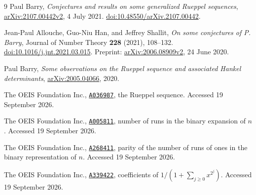 \documentclass[11pt,a4paper]{article}
\numberwithin{equation}{section}
\theoremstyle{definition}
\theoremstyle{remark}
\newcommand{\oeis}[1]{\href{https://oeis.org/#1}{\texttt{#1}}}
\newcommand{\arxiv}[1]{\href{https://arxiv.org/abs/#1}{arXiv:#1}}
\begin{document}
\begin{thebibliography}{9}
Paul Barry,
\emph{Conjectures and results on some generalized Rueppel sequences},
\arxiv{2107.00442v2}, 4 July 2021.
\href{https://doi.org/10.48550/arXiv.2107.00442}{doi:10.48550/arXiv.2107.00442}.

Jean-Paul Allouche, Guo-Niu Han, and Jeffrey Shallit,
\emph{On some conjectures of P. Barry},
Journal of Number Theory \textbf{228} (2021), 108--132.
\href{https://doi.org/10.1016/j.jnt.2021.03.015}{doi:10.1016/j.jnt.2021.03.015}.
Preprint: \arxiv{2006.08909v2}, 24 June 2020.

Paul Barry,
\emph{Some observations on the Rueppel sequence and associated Hankel determinants},
\arxiv{2005.04066}, 2020.

The OEIS Foundation Inc.,
\oeis{A036987}, the Rueppel sequence. Accessed 19 September 2026.

The OEIS Foundation Inc.,
\oeis{A005811}, number of runs in the binary expansion of $n$.
Accessed 19 September 2026.

The OEIS Foundation Inc.,
\oeis{A268411}, parity of the number of runs of ones in the binary
representation of $n$. Accessed 19 September 2026.

The OEIS Foundation Inc.,
\oeis{A339422}, coefficients of $1/(1+\sum_{j\ge0}x^{2^j})$.
Accessed 19 September 2026.
\end{thebibliography}
\end{document}
